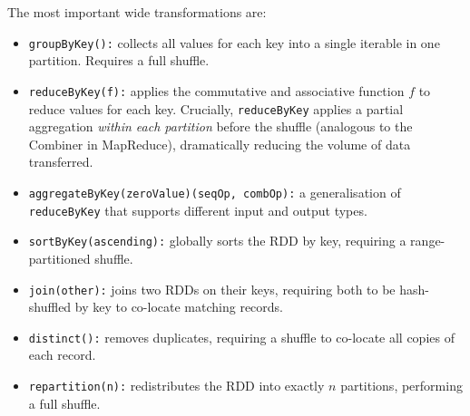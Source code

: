 The most important wide transformations are:

\begin{itemize}
  \item \texttt{groupByKey():} collects all values for each key into a
        single iterable in one partition. Requires a full shuffle.
  \item \texttt{reduceByKey(f):} applies the commutative and associative
        function $f$ to reduce values for each key. Crucially,
        \texttt{reduceByKey} applies a partial aggregation \emph{within
        each partition} before the shuffle (analogous to the Combiner in
        MapReduce), dramatically reducing the volume of data transferred.
  \item \texttt{aggregateByKey(zeroValue)(seqOp, combOp):} a generalisation
        of \texttt{reduceByKey} that supports different input and output types.
  \item \texttt{sortByKey(ascending):} globally sorts the RDD by key,
        requiring a range-partitioned shuffle.
  \item \texttt{join(other):} joins two RDDs on their keys, requiring
        both to be hash-shuffled by key to co-locate matching records.
  \item \texttt{distinct():} removes duplicates, requiring a shuffle to
        co-locate all copies of each record.
  \item \texttt{repartition(n):} redistributes the RDD into exactly $n$
        partitions, performing a full shuffle.
\end{itemize}

